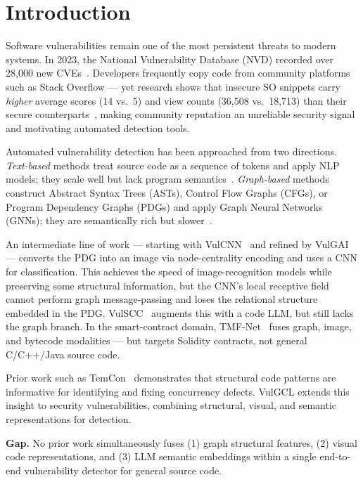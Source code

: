 \section{Introduction}
\label{sec:introduction}

Software vulnerabilities remain one of the most persistent threats to modern
systems. In 2023, the National Vulnerability Database (NVD) recorded over
28,000 new CVEs~\cite{nvd2023}. Developers frequently copy code from community
platforms such as Stack Overflow — yet research shows that insecure SO snippets
carry \emph{higher} average scores (14 vs.\ 5) and view counts (36,508
vs.\ 18,713) than their secure counterparts~\cite{chen2019reliable}, making
community reputation an unreliable security signal and motivating automated
detection tools.

Automated vulnerability detection has been approached from two directions.
\emph{Text-based} methods treat source code as a sequence of tokens and apply
NLP models; they scale well but lack program semantics~\cite{vulcnn}.
\emph{Graph-based} methods construct Abstract Syntax Trees (ASTs), Control Flow
Graphs (CFGs), or Program Dependency Graphs (PDGs) and apply Graph Neural
Networks (GNNs); they are semantically rich but slower~\cite{regvd,ignnvd}.

An intermediate line of work — starting with VulCNN~\cite{vulcnn} and refined
by VulGAI~\cite{vulgai} — converts the PDG into an image via node-centrality
encoding and uses a CNN for classification. This achieves the speed of
image-recognition models while preserving some structural information, but the
CNN's local receptive field cannot perform graph message-passing and loses the
relational structure embedded in the PDG. VulSCC~\cite{vulscc} augments this
with a code LLM, but still lacks the graph branch. In the smart-contract domain,
TMF-Net~\cite{tmfnet} fuses graph, image, and bytecode modalities — but targets
Solidity contracts, not general C/C++/Java source code.

Prior work such as TemCon~\cite{temcon} demonstrates that structural code 
patterns are informative for identifying and fixing concurrency defects. VulGCL
extends this insight to security vulnerabilities, combining structural, visual, and
semantic representations for detection. 

\textbf{Gap.} No prior work simultaneously fuses (1) graph structural features,
(2) visual code representations, and (3) LLM semantic embeddings within a
single end-to-end vulnerability detector for general source code.

